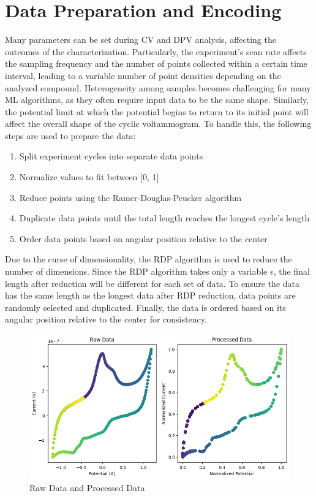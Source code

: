 \section{Data Preparation and Encoding}
Many parameters can be set during CV and DPV analysis, affecting the outcomes of the characterization. Particularly, the experiment's scan rate affects the sampling frequency and the number of points collected within a certain time interval, leading to a variable number of point densities depending on the analyzed compound. Heterogeneity among samples becomes challenging for many ML algorithms, as they often require input data to be the same shape. Similarly, the potential limit at which the potential begins to return to its initial point will affect the overall shape of the cyclic voltammogram. To handle this, the following steps are used to prepare the data:
\begin{enumerate}
    \item Split experiment cycles into separate data points
    \item Normalize values to fit between [0, 1]
    \item Reduce points using the Ramer-Douglas-Peucker algorithm
    \item Duplicate data points until the total length reaches the longest cycle's length
    \item Order data points based on angular position relative to the center
\end{enumerate}
Due to the curse of dimensionality, the RDP algorithm is used to reduce the number of dimensions. Since the RDP algorithm takes only a variable $\epsilon$, the final length after reduction will be different for each set of data. To ensure the data has the same length as the longest data after RDP reduction, data points are randomly selected and duplicated. Finally, the data is ordered based on its angular position relative to the center for consistency.
\begin{figure}[h!]
  \centering
    \includegraphics[width=1.0\textwidth]{figures/encoding.png}
    \caption{Raw Data and Processed Data}
    \label{encoding}
\end{figure}
